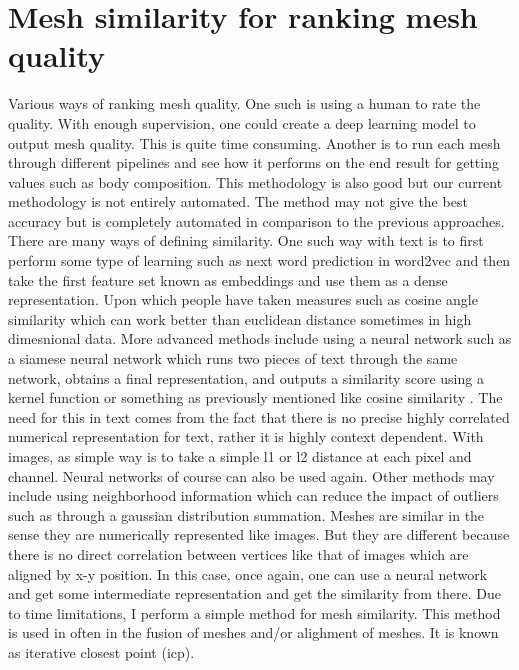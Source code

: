 \section{Mesh similarity for ranking mesh quality}
Various ways of ranking mesh quality. One such is using a human to rate the quality. With enough supervision, one could create a deep learning model to output mesh quality. This is quite time consuming. Another is to run each mesh through different pipelines and see how it performs on the end result for getting values such as body composition. This methodology is also good but our current methodology is not entirely automated. The method may not give the best accuracy but is completely automated in comparison to the previous approaches. There are many ways of defining similarity. One such way with text is to first perform some type of learning such as next word prediction in word2vec and then take the first feature set known as embeddings and use them as a dense representation. Upon which people have taken measures such as cosine angle similarity which can work better than euclidean distance sometimes in high dimesnional data. More advanced methods include using a neural network such as a siamese neural network which runs two pieces of text through the same network, obtains a final representation, and outputs a similarity score using a kernel function or something as previously mentioned like cosine similarity \cite{bertinetto2016fully}. The need for this in text comes from the fact that there is no precise highly correlated numerical representation for text, rather it is highly context dependent. With images, as simple way is to take a simple l1 or l2 distance at each pixel and channel. Neural networks of course can also be used again. Other methods may include using neighborhood information which can reduce the impact of outliers such as through a gaussian distribution summation. Meshes are similar in the sense they are numerically represented like images. But they are different because there is no direct correlation between vertices like that of images which are aligned by x-y position. In this case, once again, one can use a neural network and get some intermediate representation and get the similarity from there. Due to time limitations, I perform a simple method for mesh similarity. This method is used in often in the fusion of meshes and/or alighment of meshes. It is known as iterative closest point (icp).

